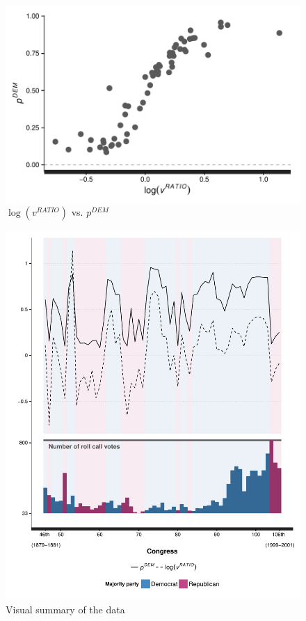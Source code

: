 \begin{figure}
\centering
	\includegraphics[scale=0.75]{sections/figs/logvratio_vs_pdem}
\caption{$\log{(v^{RATIO} )}$  vs. $p^{DEM}$}
\label{fig:log_vratio_vs_ptdem}
\end{figure}
%



\begin{figure}
\centering
	\includegraphics[scale=0.75]{sections/figs/vis_summary}
\caption{Visual summary of the data}
\label{fig:data_summary}
\end{figure}
%

